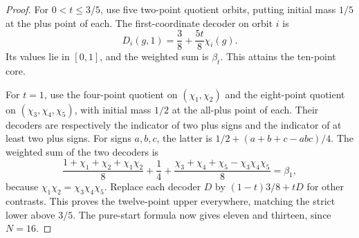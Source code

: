 \begin{proof}
For $0<t\le3/5$, use five two-point quotient orbits, putting initial
mass $1/5$ at the plus point of each. The first-coordinate decoder on
orbit $i$ is
\[
 D_i(g,1)=\frac38+\frac{5t}{8}\chi_i(g).
\]
Its values lie in $[0,1]$, and the weighted sum is $\beta_t$. This
attains the ten-point core.

For $t=1$, use the four-point quotient on $(\chi_1,\chi_2)$ and the
eight-point quotient on $(\chi_3,\chi_4,\chi_5)$, with initial mass
$1/2$ at the all-plus point of each. Their decoders are respectively
the indicator of two plus signs and the indicator of at least two plus
signs. For signs $a,b,c$, the latter is
$1/2+(a+b+c-abc)/4$. The weighted sum of the two decoders is
\[
 \frac{1+\chi_1+\chi_2+\chi_1\chi_2}{8}
 +\frac14+
   \frac{\chi_3+\chi_4+\chi_5-\chi_3\chi_4\chi_5}{8}
 =\beta_1,
\]
because $\chi_1\chi_2=\chi_3\chi_4\chi_5$. Replace each decoder $D$ by
$(1-t)3/8+tD$ for other contrasts. This proves the twelve-point upper
everywhere, matching the strict lower above $3/5$.
The pure-start formula now gives eleven and thirteen, since $N=16$.
\end{proof}

